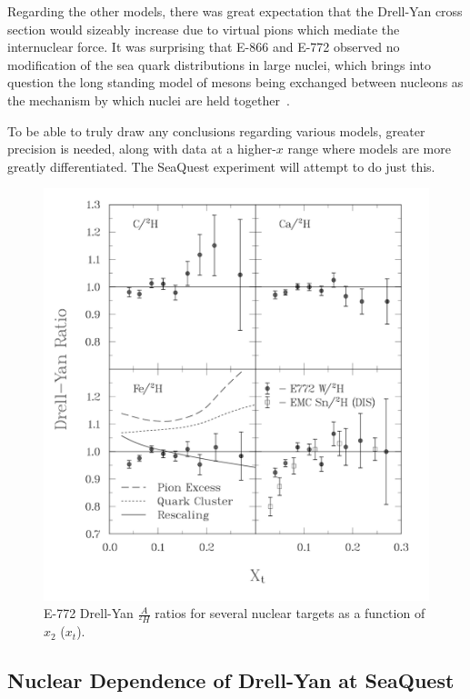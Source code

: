 Regarding the other models, there was great expectation that the Drell-Yan cross section would sizeably increase due to virtual pions which mediate the internuclear force. It was surprising that E-866 and E-772 observed no modification of the sea quark distributions in large nuclei, which brings into question the long standing model of mesons being exchanged between nucleons as the mechanism by which nuclei are held together~\cite{Carlson:1997qn}.

To be able to truly draw any conclusions regarding various models, greater precision is needed, along with data at a higher-$x$ range where models are more greatly differentiated. The SeaQuest experiment will attempt to do just this.

\begin{figure}
	\centering
	\includegraphics[width=\textwidth]{figures/background/dyfig9.png}
	\caption{E-772 Drell-Yan $\frac{A}{^2H}$ ratios for several nuclear targets as a function of $x_2$ ($x_t$)\cite{PhysRevLett.64.2479}.}
	\label{fig:772-dy}
\end{figure}

\subsection{Nuclear Dependence of Drell-Yan at SeaQuest}

